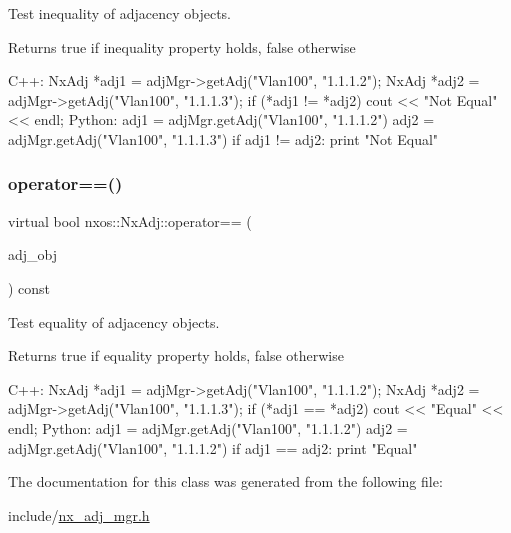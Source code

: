 Test inequality of adjacency objects.

\begin{DoxyReturn}{Returns}
true if inequality property holds, false otherwise
\end{DoxyReturn}

\begin{DoxyCode}
C++:
    NxAdj *adj1 = adjMgr->getAdj(\textcolor{stringliteral}{"Vlan100"}, \textcolor{stringliteral}{"1.1.1.2"});
    NxAdj *adj2 = adjMgr->getAdj(\textcolor{stringliteral}{"Vlan100"}, \textcolor{stringliteral}{"1.1.1.3"});
    \textcolor{keywordflow}{if} (*adj1 != *adj2)
        cout << \textcolor{stringliteral}{"Not Equal"} << endl;
Python:
    adj1 = adjMgr.getAdj(\textcolor{stringliteral}{"Vlan100"}, \textcolor{stringliteral}{"1.1.1.2"})
    adj2 = adjMgr.getAdj(\textcolor{stringliteral}{"Vlan100"}, \textcolor{stringliteral}{"1.1.1.3"})
    \textcolor{keywordflow}{if} adj1 != adj2:
         print \textcolor{stringliteral}{"Not Equal"}
\end{DoxyCode}
 \mbox{\label{classnxos_1_1_nx_adj_a19eea20ba216dd722d783bbb0982814e}} 
\subsubsection{\texorpdfstring{operator==()}{operator==()}}
{\footnotesize\ttfamily virtual bool nxos\+::\+Nx\+Adj\+::operator== (\begin{DoxyParamCaption}\item[{\mbox{\hyperlink{classnxos_1_1_nx_adj}{Nx\+Adj}} const \&}]{adj\+\_\+obj }\end{DoxyParamCaption}) const\hspace{0.3cm}{\ttfamily [pure virtual]}}

Test equality of adjacency objects.

\begin{DoxyReturn}{Returns}
true if equality property holds, false otherwise
\end{DoxyReturn}

\begin{DoxyCode}
C++:
    NxAdj *adj1 = adjMgr->getAdj(\textcolor{stringliteral}{"Vlan100"}, \textcolor{stringliteral}{"1.1.1.2"});
    NxAdj *adj2 = adjMgr->getAdj(\textcolor{stringliteral}{"Vlan100"}, \textcolor{stringliteral}{"1.1.1.3"});
    \textcolor{keywordflow}{if} (*adj1 == *adj2)
        cout << \textcolor{stringliteral}{"Equal"} << endl;
Python:
    adj1 = adjMgr.getAdj(\textcolor{stringliteral}{"Vlan100"}, \textcolor{stringliteral}{"1.1.1.2"})
    adj2 = adjMgr.getAdj(\textcolor{stringliteral}{"Vlan100"}, \textcolor{stringliteral}{"1.1.1.2"})
    \textcolor{keywordflow}{if} adj1 == adj2:
         print \textcolor{stringliteral}{"Equal"}
\end{DoxyCode}
 

The documentation for this class was generated from the following file\+:\begin{DoxyCompactItemize}
\item 
include/\mbox{\hyperlink{nx__adj__mgr_8h}{nx\+\_\+adj\+\_\+mgr.\+h}}\end{DoxyCompactItemize}
